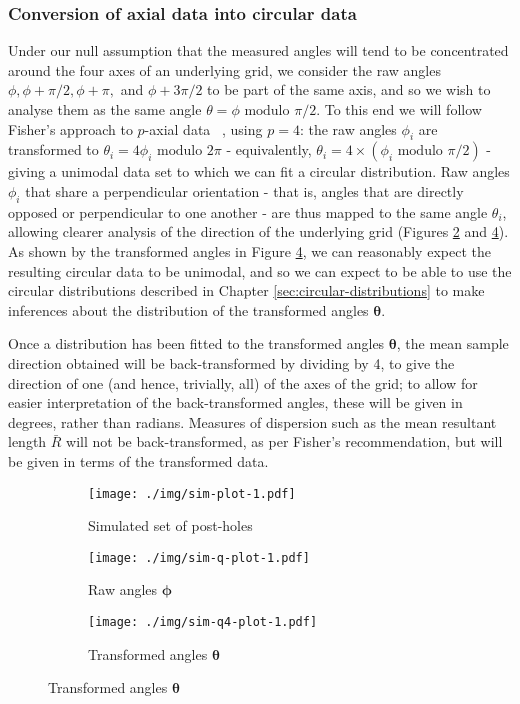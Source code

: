 \documentclass[../../ArchStats.tex]{subfiles}
\begin{document}
\subsubsection{Conversion of axial data into circular data}
Under our null assumption that the measured angles will tend to be concentrated around the four axes of an underlying grid, we consider the raw angles $\phi, \phi + \pi/2, \phi + \pi,$ and $\phi + 3\pi/2$ to be part of the same axis, and so we wish to analyse them as the same angle $\theta = \phi \text{ modulo }\pi/2$.
To this end we will follow Fisher's approach to $p$-axial data ~\cite{Fisher1993}, using $p=4$: the raw angles $\phi_i$ are transformed to $\theta_i = 4\phi_i \text{ modulo } 2\pi$ - equivalently, $\theta_i = 4 \times (\phi_i \text{ modulo }\pi/2)$ - giving a unimodal data set to which we can fit a circular distribution. Raw angles $\phi_i$ that share a perpendicular orientation - that is, angles that are directly opposed or perpendicular to one another - are thus mapped to the same angle $\theta_i$, allowing clearer analysis of the direction of the underlying grid (Figures \ref{fig:sim-q-plot-1} and \ref{fig:sim-q4-plot-1}). As shown by the transformed angles in Figure \ref{fig:sim-q4-plot-1}, we can reasonably expect the resulting circular data to be unimodal, and so we can expect to be able to use the circular distributions described in Chapter \ref{sec:circular-distributions} to make inferences about the distribution of the transformed angles $\mathbf{\theta}$.

Once a distribution has been fitted to the transformed angles $\mathbf{\theta}$, the mean sample direction obtained will be back-transformed by dividing by 4, to give the direction of one (and hence, trivially, all) of the axes of the grid; to allow for easier interpretation of the back-transformed angles, these will be given in degrees, rather than radians. Measures of dispersion such as the mean resultant length $\bar{R}$ will not be back-transformed, as per Fisher's recommendation, but will be given in terms of the transformed data.

\begin{figure}[h!]
\caption{Simulated set of buildings with post-holes 1m apart, with $N(0,0.1)$ perturbation, and associated angles. The  kernel density is shown in red. }
\centering
\label{fig:sim1}
\begin{subfigure}[t]{0.38\textwidth}
\caption{Simulated set of post-holes}
\label{fig:sim-plot-1}
\texttt{[image: ./img/sim-plot-1.pdf]}
\end{subfigure}
\begin{subfigure}[t]{0.3\textwidth}
\caption{Raw angles $\boldsymbol{\phi}$}
\label{fig:sim-q-plot-1}
\texttt{[image: ./img/sim-q-plot-1.pdf]}
\end{subfigure}
\begin{subfigure}[t]{0.3\textwidth}
\caption{Transformed angles $\boldsymbol{\theta}$}
\label{fig:sim-q4-plot-1}
\texttt{[image: ./img/sim-q4-plot-1.pdf]}
\end{subfigure}
\end{figure}
\end{document}
